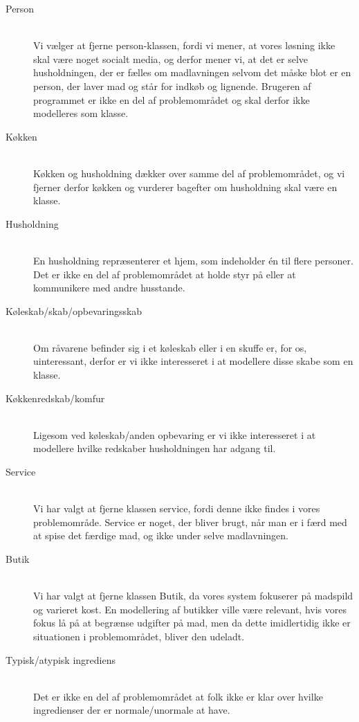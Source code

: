 \begin{description}
\item[Person] \hfill \\
Vi vælger at fjerne person-klassen, fordi vi mener, at vores løsning ikke skal være noget socialt media, og derfor mener vi, at det er selve husholdningen, der er fælles om madlavningen selvom det måske blot er en person, der laver mad og står for indkøb og lignende. Brugeren af programmet er ikke en del af problemområdet og skal derfor ikke modelleres som klasse.

\item[Køkken] \hfill \\
Køkken og husholdning dækker over samme del af problemområdet, og vi fjerner derfor køkken og vurderer bagefter om husholdning skal være en klasse.

\item[Husholdning] \hfill \\
En husholdning repræsenterer et hjem, som indeholder én til flere personer. Det er ikke en del af problemområdet at holde styr på eller at kommunikere med andre husstande.

\item[Køleskab/skab/opbevaringsskab] \hfill \\
Om råvarene befinder sig i et køleskab eller i en skuffe er, for os, uinteressant, derfor er vi ikke interesseret i at modellere disse skabe som en klasse.

\item[Køkkenredskab/komfur] \hfill \\
Ligesom ved køleskab/anden opbevaring er vi ikke interesseret i at modellere hvilke redskaber husholdningen har adgang til.

\item[Service] \hfill \\ 
Vi har valgt at fjerne klassen service, fordi denne ikke findes i vores problemområde. Service er noget, der bliver brugt, når man er i færd med at spise det færdige mad, og ikke under selve madlavningen.

\item[Butik] \hfill \\
Vi har valgt at fjerne klassen Butik, da vores system fokuserer på madspild og varieret kost. En modellering af butikker ville være relevant, hvis vores fokus lå på at begrænse udgifter på mad, men da dette imidlertidig ikke er situationen i problemområdet, bliver den udeladt.

\item[Typisk/atypisk ingrediens] \hfill \\
Det er ikke en del af problemområdet at folk ikke er klar over hvilke ingredienser der er normale/unormale at have.


\end{description}
